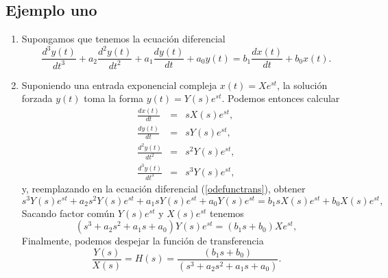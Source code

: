 \subsection{Ejemplo uno}

\begin{enumerate}
\item Supongamos que tenemos la ecuaci\'{o}n diferencial
\begin{equation}
        \frac{d^{3}y\left( t\right) }{dt^{3}}+
        a_{2} \frac{d^{2}y\left( t\right) }{dt^{2}}+
        a_{1} \frac{dy\left( t\right) }{dt}+
        a_{0} y\left( t\right) =
        b_{1} \frac{dx\left( t\right) }{dt} +
        b_{0} x\left( t\right). \label{odefunctrans}
\end{equation}

\item Suponiendo una entrada exponencial compleja $x(t) = X e^{s t}$, la soluci\'{o}n forzada $y(t)$ toma la 
forma $y(t) = Y(s) e^{s t}$. Podemos entonces calcular
\begin{eqnarray}
        \frac{dx\left( t\right) }{dt}           &=& s X(s) e^{s t},                \\
        \frac{dy\left( t\right) }{dt}           &=& s Y(s) e^{s t},                \\
        \frac{d^{2}y\left( t\right) }{dt^{2}}   &=& s^{2} Y(s) e^{s t},            \\
        \frac{d^{3}y\left( t\right) }{dt^{3}}   &=& s^{3} Y(s) e^{s t},
\end{eqnarray}
y, reemplazando en la ecuaci\'{o}n diferencial (\ref{odefunctrans}), obtener
\begin{equation}
  s^{3} Y(s) e^{s t} + a_{2} s^{2} Y(s) e^{s t} + a_{1} s Y(s) e^{s t} + a_{0} Y(s) e^{s t} = 
      b_{1} s X(s) e^{s t} + b_{0} X(s) e^{s t},
\end{equation}
Sacando factor com\'{u}n $Y(s) e^{s t}$ y $X(s) e^{s t}$ tenemos
\begin{equation}
        \left( s^{3} + a_{2} s^{2}  + a_{1} s  + a_{0} \right) Y(s)
        e^{s t} = \left( b_{1} s + b_{0} \right) X e^{s t},
\end{equation}
Finalmente, podemos despejar la funci\'{o}n de transferencia
\begin{equation}
  \frac{Y(s)}{X(s)} = H(s) =  
  \frac{\left( b_{1} s + b_{0} \right)}{\left( s^{3} + a_{2} s^{2}  + a_{1} s  + a_{0} \right)}.
\end{equation}

\end{enumerate}

